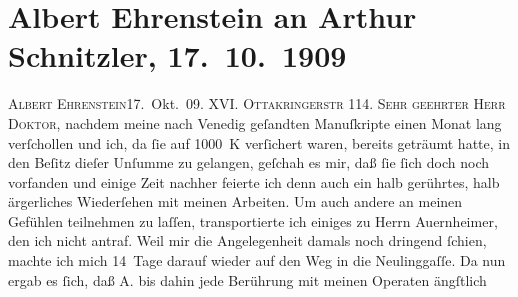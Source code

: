 

               \section[Albert Ehrenstein an Arthur Schnitzler, 17. 10. 1909]{ Albert Ehrenstein an Arthur Schnitzler, 17. 10. 1909}\nopagebreak{}\rehead{ }\begin{ledgroupsized}[t]{13cm}\normalsize\beginnumbering{} \toendnotes[C]{\smallbreak\pagebreak[2]} 
\toendnotes[C]{\smallbreak}\pstart
           {\pb}\textsc{Albert Ehrenstein}\hfill 17. Okt. 09. \pend
           \pstart
           \textsc{XVI. Ottakringerstr} 114.\pend
           \pstart{}\textsc{Sehr geehrter Herr Doktor,}\pend\pstart
           nachdem meine nach Venedig geſandten Manuſkripte
                    einen Monat lang verſchollen und ich, da ſie auf 1000 K verſichert waren,
                    bereits geträumt hatte, in den Beſitz dieſer Unſumme zu gelangen, geſchah es
                    mir, daß ſie ſich doch noch vorfanden und einige Zeit nachher feierte ich denn
                    auch ein halb gerührtes, halb ärgerliches Wiederſehen mit meinen Arbeiten. Um
                    auch andere an meinen Gefühlen teilnehmen zu laſſen, transportierte ich einiges
                    zu Herrn Auernheimer, den ich nicht antraf.
                    Weil mir die Angelegenheit {\pb}damals noch dringend
                    ſchien, machte ich mich 14 Tage darauf wieder auf den Weg in die Neulinggaſſe. Da nun ergab es ſich, daß A. bis dahin jede Berührung mit meinen Operaten ängſtlich

\end{ledgroupsized}
